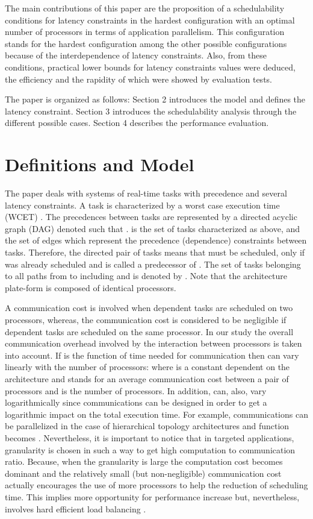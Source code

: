\documentclass{ijcaArticle}
\begin{document}
The main contributions of this paper are
the proposition of a schedulability conditions for latency constraints in the hardest configuration with an optimal number of processors in terms of application parallelism. This configuration stands for the hardest configuration among the other possible configurations because of the interdependence of latency constraints. Also, from these conditions, practical lower bounds  for latency constraints values were deduced, the efficiency and the rapidity of which were showed by evaluation tests.





The paper is organized as follows: Section 2 introduces the model and defines the latency constraint. Section 3 introduces the schedulability analysis  through the different possible cases. Section 4 describes the performance evaluation.

\section{Definitions and Model}\label{model}
The paper deals with systems of real-time tasks with precedence and several latency constraints. A task  is characterized by a worst case execution time (WCET)
. The precedences between tasks are represented by a directed acyclic graph (DAG) denoted  such that .  is the
set of tasks characterized as above, and  the set of edges which represent the precedence (dependence) constraints between tasks. Therefore, the directed pair of tasks  means that  must be scheduled, only if  was already scheduled and  is called a predecessor of .  The set of tasks belonging to all paths from  to  including 
and  is  denoted by .  Note that the architecture plate-form is composed of identical processors.
  
A communication cost is involved when dependent tasks are scheduled on two processors, whereas, the communication cost is considered to be negligible if dependent tasks are scheduled on the same processor.   In our study the overall communication overhead involved by the interaction between processors is taken into account.  If  is the function of time needed for communication then   can vary linearly with the number of processors:   where  is a constant dependent on the architecture and stands for an average communication cost between a pair of processors and  is the number of processors. In addition,    can, also, vary logarithmically since communications can be designed in order to get a logarithmic impact on the total execution time. For example, communications can be parallelized in the case of hierarchical topology architectures and function  becomes . Nevertheless, it is important to notice that in targeted applications, granularity is chosen in such a way to get high computation to communication ratio. 
Because, when the granularity is large the computation cost becomes dominant  and the relatively small (but non-negligible) communication cost actually encourages the use of more processors to help the reduction of scheduling time. This implies more opportunity for performance increase but, nevertheless, involves hard efficient load balancing \cite{Book:IntroductionToParallelComputing}.
\end{document}
